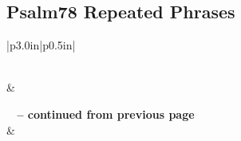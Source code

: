 \subsection{Psalm78 Repeated Phrases}


\normalsize
 
\begin{center}
\begin{longtable}{|p{3.0in}|p{0.5in}|}
\caption[Psalm78 Repeated Phrases]{Psalm78 Repeated Phrases}\label{table:Repeated Phrases Psalm78} \\
\hline {} &  \\ \hline 
\endfirsthead
 
{{\bfseries \tablename\ \thetable{} -- continued from previous page}} \\  
\hline {} &  \\ \hline 
\endhead
 

\end{longtable}
\end{center}
